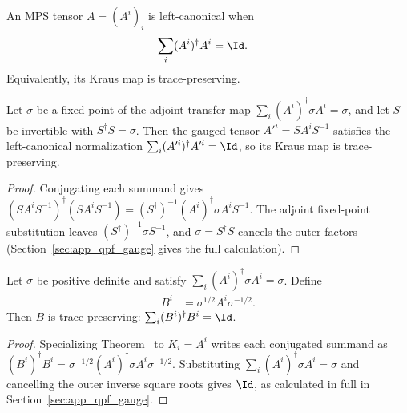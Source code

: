 \begin{definition}
    \label{def:left_canonical_tensor}
    \leanok
    An MPS tensor $A=(A^i)_i$ is left-canonical when
    \begin{align}
        \sum_i (A^i)^\dagger A^i
         & =\Id.
        \notag
    \end{align}
    Equivalently, its Kraus map is trace-preserving.
\end{definition}

\begin{theorem}\label{thm:left_canonical_gauge}
    \leanok
    Let $\sigma$ be a fixed point of the adjoint transfer map
    $\sum_i (A^i)^\dagger \sigma A^i = \sigma$,
    and let $S$ be invertible with $S^\dagger S = \sigma$.
    Then the gauged tensor $A'^i = SA^iS^{-1}$ satisfies the left-canonical
    normalization $\sum_i (A'^i)^\dagger A'^i = \Id$, so its Kraus map is
    trace-preserving.
\end{theorem}

\begin{proof}\leanok
    Conjugating each summand gives
    $(SA^iS^{-1})^\dagger(SA^iS^{-1})
        =(S^\dagger)^{-1}(A^i)^\dagger\sigma A^iS^{-1}$.
    The adjoint fixed-point substitution leaves
    $(S^\dagger)^{-1}\sigma S^{-1}$, and $\sigma=S^\dagger S$ cancels
    the outer factors (Section~\ref{sec:app_qpf_gauge} gives the full
    calculation).
\end{proof}

\begin{lemma}%
    \label{thm:tp_gauge_from_adjoint_fixed}
    \leanok
    Let $\sigma$ be positive definite and satisfy
    $\sum_i (A^i)^\dagger \sigma A^i = \sigma$.
    Define
    \begin{align}
        B^i
         & = \sigma^{1/2}A^i\sigma^{-1/2}.
        \label{eq:qpf_tp_gauge}
    \end{align}
    Then $B$ is trace-preserving:
    $\sum_i (B^i)^\dagger B^i = \Id$.
\end{lemma}

\begin{proof}\leanok
    Specializing
    Theorem~\cite[``Trace-preserving gauge from an adjoint fixed point, Kraus form'']{QICLean2026Blueprint}
    to $K_i = A^i$ writes each conjugated summand as
    $(B^i)^\dagger B^i
        =\sigma^{-1/2}(A^i)^\dagger\sigma A^i\sigma^{-1/2}$.
    Substituting $\sum_i(A^i)^\dagger\sigma A^i=\sigma$ and cancelling
    the outer inverse square roots gives $\Id$, as calculated in full in
    Section~\ref{sec:app_qpf_gauge}.
\end{proof}

